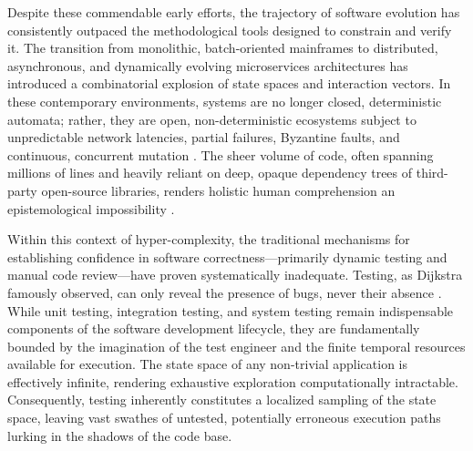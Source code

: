 Despite these commendable early efforts, the trajectory of software evolution has consistently outpaced the methodological tools designed to constrain and verify it. The transition from monolithic, batch-oriented mainframes to distributed, asynchronous, and dynamically evolving microservices architectures has introduced a combinatorial explosion of state spaces and interaction vectors. In these contemporary environments, systems are no longer closed, deterministic automata; rather, they are open, non-deterministic ecosystems subject to unpredictable network latencies, partial failures, Byzantine faults, and continuous, concurrent mutation \cite{lynch1996distributed, coulouris2011distributed}. The sheer volume of code, often spanning millions of lines and heavily reliant on deep, opaque dependency trees of third-party open-source libraries, renders holistic human comprehension an epistemological impossibility \cite{parnas1994software}.

Within this context of hyper-complexity, the traditional mechanisms for establishing confidence in software correctness—primarily dynamic testing and manual code review—have proven systematically inadequate. Testing, as Dijkstra famously observed, can only reveal the presence of bugs, never their absence \cite{dijkstra1970notes}. While unit testing, integration testing, and system testing remain indispensable components of the software development lifecycle, they are fundamentally bounded by the imagination of the test engineer and the finite temporal resources available for execution. The state space of any non-trivial application is effectively infinite, rendering exhaustive exploration computationally intractable. Consequently, testing inherently constitutes a localized sampling of the state space, leaving vast swathes of untested, potentially erroneous execution paths lurking in the shadows of the code base. 

